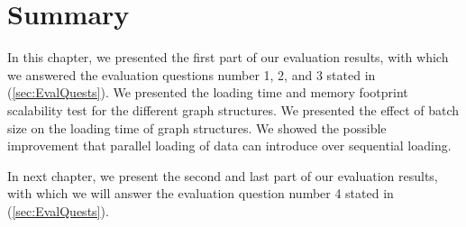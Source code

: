 {\section{Summary}
\label{sec:eval-summary_part1}

In this chapter, we presented the first part of our evaluation results, with which we answered the evaluation questions number 1, 2, and 3 stated in (\ref{sec:EvalQuests}). We presented the loading time and memory footprint scalability test for the different graph structures. We presented the effect of batch size on the loading time of graph structures. We showed the possible improvement that parallel loading of data can introduce over sequential loading.

In next chapter, we present the second and last part of our evaluation results, with which we will answer the evaluation question number 4 stated in (\ref{sec:EvalQuests}).


}